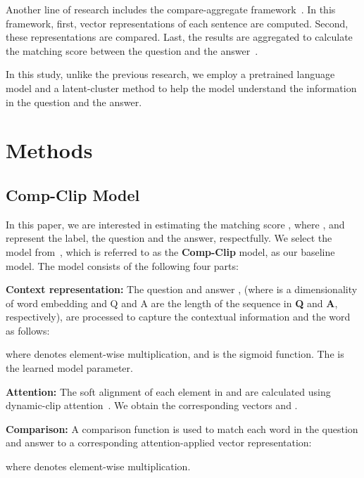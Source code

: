 \documentclass[sigconf]{acmart}
\begin{document}
Another line of research includes the compare-aggregate framework~\cite{wang2016compare}. 
In this framework, first, vector representations of each sentence are computed. Second, these representations are compared. Last, the results are aggregated to calculate the matching score between the question and the answer~\cite{bian2017compare,shen2017inter,tran2018context}. 

In this study, unlike the previous research, we employ a pretrained language model and a latent-cluster method to help the model understand the information in the question and the answer.


\section{Methods}
\label{sec:methods}

\subsection{Comp-Clip Model}
\label{ssec:compare_aggregate_model}
In this paper, we are interested in estimating the matching score , where ,  and  represent the label, the question and the answer, respectfully.
We select the model from~\cite{bian2017compare}, which is referred to as the \textbf{Comp-Clip} model, as our baseline model.
The model consists of the following four parts:

\vspace*{1mm}
\noindent\textbf{Context representation: }
The question  and answer , (where  is a dimensionality of word embedding and Q and A are the length of the sequence in \textbf{Q} and \textbf{A}, respectively), are processed to capture the contextual information and the word as follows:

where  denotes element-wise multiplication, and  is the sigmoid function. The  is the learned model parameter.


\vspace*{1mm}
\noindent\textbf{Attention: }
The soft alignment of each element in  and  are calculated using dynamic-clip attention~\cite{bian2017compare}. We obtain the corresponding vectors  and .


\vspace*{1mm}
\noindent\textbf{Comparison: }
A comparison function is used to match each word in the question and answer to a corresponding attention-applied vector representation:

where  denotes element-wise multiplication.
\end{document}
